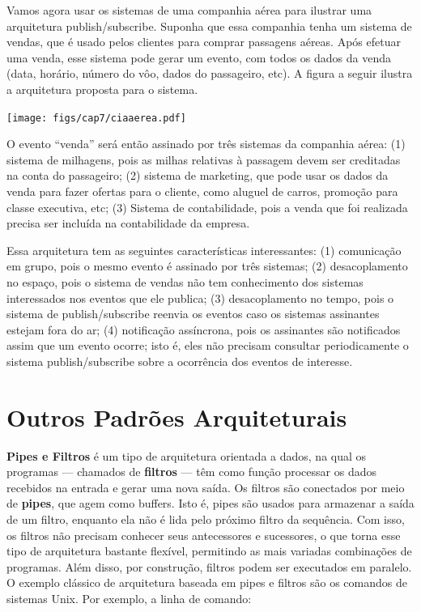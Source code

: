 \documentclass[
  11pt,
  twoside]{book}
\let\origfigure\figure
\let\endorigfigure\endfigure
\renewenvironment{figure}[1][2] {
    \expandafter\origfigure\expandafter[!h]
} {
    \endorigfigure
}
\begin{document}
Vamos agora usar os sistemas de uma companhia aérea para ilustrar uma
arquitetura publish/subscribe. Suponha que essa companhia tenha um
sistema de vendas, que é usado pelos clientes para comprar passagens
aéreas. Após efetuar uma venda, esse sistema pode gerar um evento, com
todos os dados da venda (data, horário, número do vôo, dados do
passageiro, etc). A figura a seguir ilustra a arquitetura proposta para
o sistema.

\begin{figure}
\centering
\texttt{[image: figs/cap7/ciaaerea.pdf]}
\caption{Arquitetura Pub/Sub em uma companhia aérea}
\end{figure}

O evento ``venda'' será então assinado por três sistemas da companhia
aérea: (1) sistema de milhagens, pois as milhas relativas à passagem
devem ser creditadas na conta do passageiro; (2) sistema de marketing,
que pode usar os dados da venda para fazer ofertas para o cliente, como
aluguel de carros, promoção para classe executiva, etc; (3) Sistema de
contabilidade, pois a venda que foi realizada precisa ser incluída na
contabilidade da empresa.

Essa arquitetura tem as seguintes características interessantes: (1)
comunicação em grupo, pois o mesmo evento é assinado por três sistemas;
(2) desacoplamento no espaço, pois o sistema de vendas não tem
conhecimento dos sistemas interessados nos eventos que ele publica; (3)
desacoplamento no tempo, pois o sistema de publish/subscribe reenvia os
eventos caso os sistemas assinantes estejam fora do ar; (4) notificação
assíncrona, pois os assinantes são notificados assim que um evento
ocorre; isto é, eles não precisam consultar periodicamente o sistema
publish/subscribe sobre a ocorrência dos eventos de interesse.

\hypertarget{outros-padruxf5es-arquiteturais}{%
\section{Outros Padrões
Arquiteturais}\label{outros-padruxf5es-arquiteturais}}

 

\textbf{Pipes e Filtros} é um tipo de arquitetura orientada a dados, na
qual os programas --- chamados de \textbf{filtros} --- têm como função
processar os dados recebidos na entrada e gerar uma nova saída. Os
filtros são conectados por meio de \textbf{pipes}, que agem como
buffers. Isto é, pipes são usados para armazenar a saída de um filtro,
enquanto ela não é lida pelo próximo filtro da sequência. Com isso, os
filtros não precisam conhecer seus antecessores e sucessores, o que
torna esse tipo de arquitetura bastante flexível, permitindo as mais
variadas combinações de programas. Além disso, por construção, filtros
podem ser executados em paralelo. O exemplo clássico de arquitetura
baseada em pipes e filtros são os comandos de sistemas Unix. Por
exemplo, a linha de comando:
\end{document}
